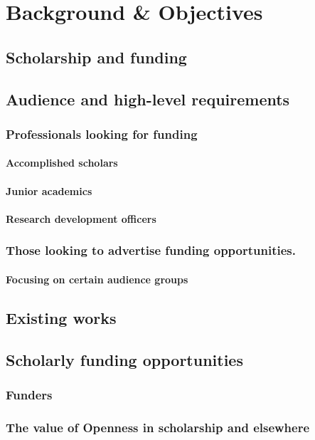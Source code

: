 \chapter{Background \& Objectives}
\section{Scholarship and funding}
\section{Audience and high-level requirements}
\subsection{Professionals looking for funding}
\subsubsection{Accomplished scholars}
\subsubsection{Junior academics}
\subsubsection{Research development officers}
\subsection{Those looking to advertise funding opportunities.}
\subsubsection{Focusing on certain audience groups}
\section{Existing works}
\section{Scholarly funding opportunities}
\subsection{Funders}
\subsection{The value of Openness in scholarship and elsewhere}
